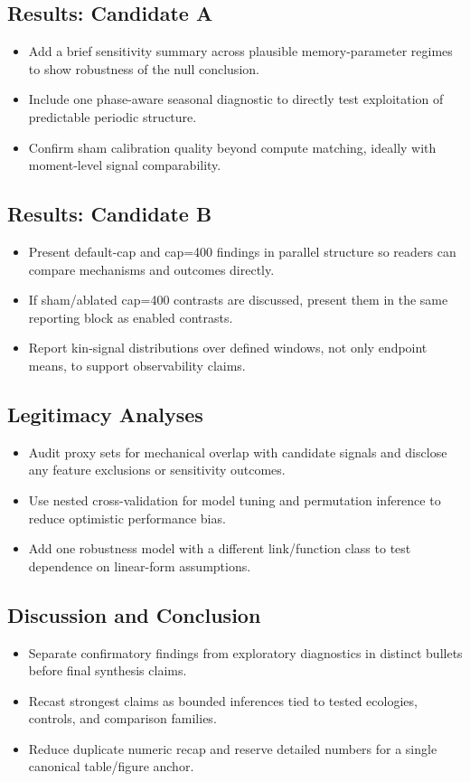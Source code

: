 \documentclass[11pt]{article}
\begin{document}
\subsection*{Results: Candidate A}
\begin{itemize}
\item Add a brief sensitivity summary across plausible memory-parameter regimes to show robustness of the null conclusion.
\item Include one phase-aware seasonal diagnostic to directly test exploitation of predictable periodic structure.
\item Confirm sham calibration quality beyond compute matching, ideally with moment-level signal comparability.
\end{itemize}

\subsection*{Results: Candidate B}
\begin{itemize}
\item Present default-cap and cap=400 findings in parallel structure so readers can compare mechanisms and outcomes directly.
\item If sham/ablated cap=400 contrasts are discussed, present them in the same reporting block as enabled contrasts.
\item Report kin-signal distributions over defined windows, not only endpoint means, to support observability claims.
\end{itemize}

\subsection*{Legitimacy Analyses}
\begin{itemize}
\item Audit proxy sets for mechanical overlap with candidate signals and disclose any feature exclusions or sensitivity outcomes.
\item Use nested cross-validation for model tuning and permutation inference to reduce optimistic performance bias.
\item Add one robustness model with a different link/function class to test dependence on linear-form assumptions.
\end{itemize}

\subsection*{Discussion and Conclusion}
\begin{itemize}
\item Separate confirmatory findings from exploratory diagnostics in distinct bullets before final synthesis claims.
\item Recast strongest claims as bounded inferences tied to tested ecologies, controls, and comparison families.
\item Reduce duplicate numeric recap and reserve detailed numbers for a single canonical table/figure anchor.
\end{itemize}
\end{document}

